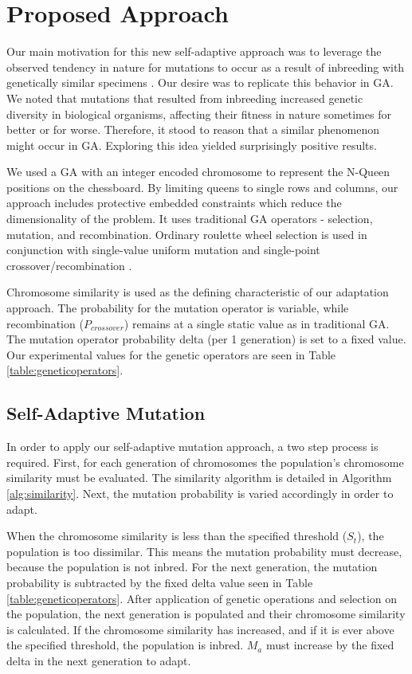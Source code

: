 \documentclass[conference]{IEEEtran}
\begin{document}
\section{Proposed Approach}\label{params}
Our main motivation for this new self-adaptive approach was to leverage the observed tendency in nature for mutations to occur as a result of inbreeding with genetically similar specimens \cite{cit:17,cit:18}. Our desire was to replicate this behavior in GA. We noted that mutations that resulted from inbreeding increased genetic diversity in biological organisms, affecting their fitness in nature sometimes for better or for worse. Therefore, it stood to reason that a similar phenomenon might occur in GA. Exploring this idea yielded surprisingly positive results.

We used a GA with an integer encoded chromosome to represent the N-Queen positions on the chessboard. By limiting queens to single rows and columns, our approach includes protective embedded constraints which reduce the dimensionality of the problem. It uses traditional GA operators - selection, mutation, and recombination. Ordinary roulette wheel selection \cite{cit:19} is used in conjunction with single-value uniform mutation and single-point crossover/recombination \cite{cit:16}. 

Chromosome similarity is used as the defining characteristic of our adaptation approach. The probability for the mutation operator is variable, while recombination ($P_{crossover}$) remains at a single static value as in traditional GA. The mutation operator probability delta (per 1 generation) is set to a fixed value. Our experimental values for the genetic operators are seen in Table \ref{table:geneticoperators}.


\subsection{Self-Adaptive Mutation}
In order to apply our self-adaptive mutation approach, a two step process is required. First, for each generation of chromosomes the population's chromosome similarity must be evaluated. The similarity algorithm is detailed in Algorithm \ref{alg:similarity}. Next, the mutation probability is varied accordingly in order to adapt.  

When the chromosome similarity is less than the specified threshold ($S_{t}$), the population is too dissimilar. This means the mutation probability must decrease, because the population is not inbred. For the next generation, the mutation probability is subtracted by the fixed delta value seen in Table \ref{table:geneticoperators}. After application of genetic operations and selection on the population, the next generation is populated and their chromosome similarity is calculated. If the chromosome similarity has increased, and if it is ever above the specified threshold, the population is inbred. $M_{a}$ must increase by the fixed delta in the next generation to adapt.
\end{document}
